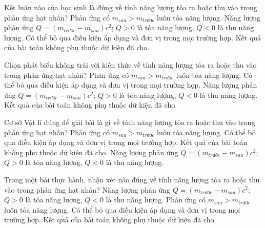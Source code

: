 \begin{ex}
Kết luận nào của học sinh là đúng về tính năng lượng tỏa ra hoặc thu vào trong phản ứng hạt nhân?
\choice
{Phản ứng có $m_{sau}\gt m_{trước}$ luôn tỏa năng lượng.}
{\True Năng lượng phản ứng $Q=(m_{trước}-m_{sau})c^2$; $Q>0$ là tỏa năng lượng, $Q<0$ là thu năng lượng.}
{Có thể bỏ qua điều kiện áp dụng và đơn vị trong mọi trường hợp.}
{Kết quả của bài toán không phụ thuộc dữ kiện đã cho.}
\end{ex}

\begin{ex}
Chọn phát biểu không trái với kiến thức về tính năng lượng tỏa ra hoặc thu vào trong phản ứng hạt nhân?
\choice
{Phản ứng có $m_{sau}\gt m_{trước}$ luôn tỏa năng lượng.}
{Có thể bỏ qua điều kiện áp dụng và đơn vị trong mọi trường hợp.}
{\True Năng lượng phản ứng $Q=(m_{trước}-m_{sau})c^2$; $Q>0$ là tỏa năng lượng, $Q<0$ là thu năng lượng.}
{Kết quả của bài toán không phụ thuộc dữ kiện đã cho.}
\end{ex}

\begin{ex}
Cơ sở Vật lí đúng để giải bài là gì về tính năng lượng tỏa ra hoặc thu vào trong phản ứng hạt nhân?
\choice
{Phản ứng có $m_{sau}\gt m_{trước}$ luôn tỏa năng lượng.}
{Có thể bỏ qua điều kiện áp dụng và đơn vị trong mọi trường hợp.}
{Kết quả của bài toán không phụ thuộc dữ kiện đã cho.}
{\True Năng lượng phản ứng $Q=(m_{trước}-m_{sau})c^2$; $Q>0$ là tỏa năng lượng, $Q<0$ là thu năng lượng.}
\end{ex}

\begin{ex}
Trong một bài thực hành, nhận xét nào đúng về tính năng lượng tỏa ra hoặc thu vào trong phản ứng hạt nhân?
\choice
{\True Năng lượng phản ứng $Q=(m_{trước}-m_{sau})c^2$; $Q>0$ là tỏa năng lượng, $Q<0$ là thu năng lượng.}
{Phản ứng có $m_{sau}\gt m_{trước}$ luôn tỏa năng lượng.}
{Có thể bỏ qua điều kiện áp dụng và đơn vị trong mọi trường hợp.}
{Kết quả của bài toán không phụ thuộc dữ kiện đã cho.}
\end{ex}

